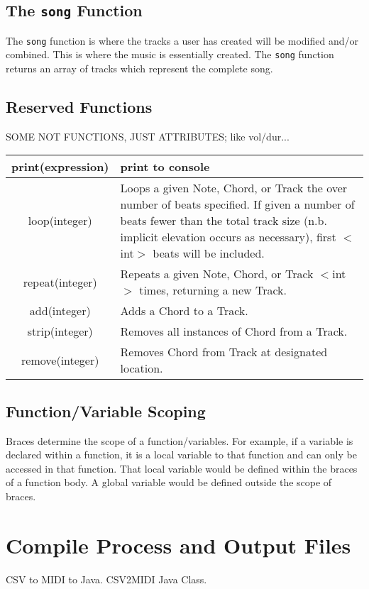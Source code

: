 \documentclass[letterpaper]{article}
\begin{document}
\subsection{The \texttt{song} Function}
The \texttt{song} function is where the tracks a user has created will be modified and/or combined. This is where the music is essentially created. The \texttt{song} function returns an array of tracks which represent the complete song.

\begin{samepage}
\subsection{Reserved Functions}
\begin{table}[H]
\centering
SOME NOT FUNCTIONS, JUST ATTRIBUTES; like vol/dur...
\begin{tabularx}{.75\textwidth}{|c|X|}
\hline
print(expression) & print to console \\
\hline
loop(integer) & Loops a given Note, Chord, or Track the over number of beats specified. If given a number of beats fewer than the total track size (n.b. implicit elevation occurs as necessary), first $<$int$>$ beats will be included. \\
\hline
repeat(integer) & Repeats a given Note, Chord, or Track $<$int$>$ times, returning a new Track. \\
\hline
add(integer) & Adds a Chord to a Track. \\
\hline
strip(integer) & Removes all instances of Chord from a Track. \\
\hline
remove(integer) & Removes Chord from Track at designated location. \\
\hline
\end{tabularx}
\end{table}
\end{samepage}

\subsection{Function/Variable Scoping}
Braces determine the scope of a function/variables. For example, if a variable is declared within a function, it is a local variable to that function and can only be accessed in that function. That local variable would be defined within the braces of a function body. A global variable would be defined outside the scope of braces.

\section{Compile Process and Output Files}
CSV to MIDI to Java. CSV2MIDI Java Class. 
\end{document}
